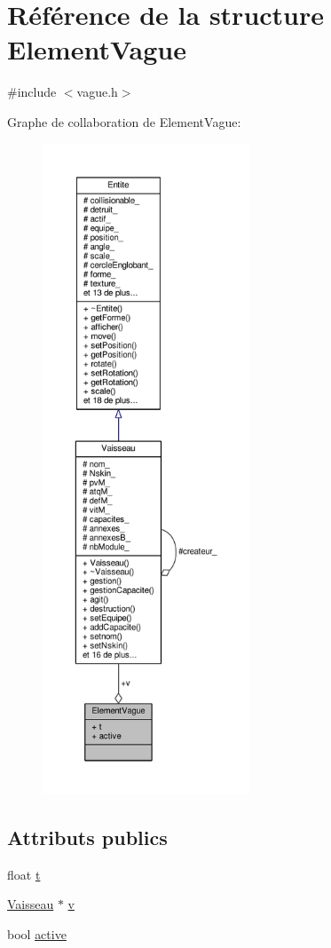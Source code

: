 \hypertarget{struct_element_vague}{}\section{Référence de la structure Element\+Vague}
\label{struct_element_vague}


{\ttfamily \#include $<$vague.\+h$>$}



Graphe de collaboration de Element\+Vague\+:\nopagebreak
\begin{figure}[H]
\begin{center}
\leavevmode
\includegraphics[height=550pt]{struct_element_vague__coll__graph}
\end{center}
\end{figure}
\subsection*{Attributs publics}
\begin{DoxyCompactItemize}
\item 
float \hyperlink{struct_element_vague_af6645ffc5fbc3be59dbf5063a78f8e36}{t}
\item 
\hyperlink{class_vaisseau}{Vaisseau} $\ast$ \hyperlink{struct_element_vague_a74ef9460cb2ccf37f07caa28b48959ec}{v}
\item 
bool \hyperlink{struct_element_vague_ab0bd206a38ece486f6f5bb9ec76ff36b}{active}
\end{DoxyCompactItemize}


